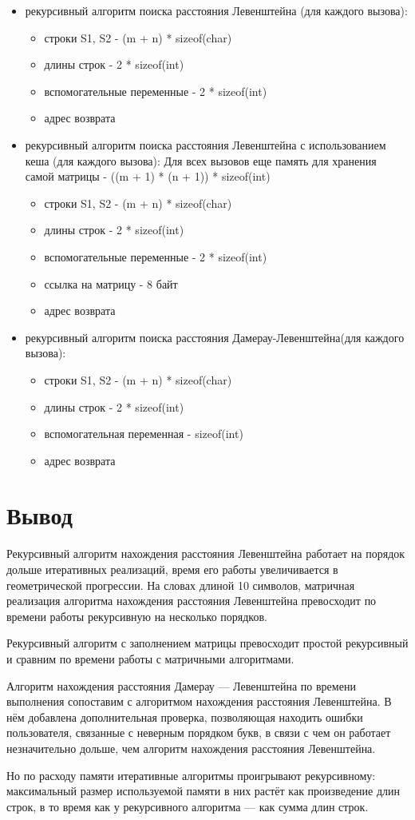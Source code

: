 \begin{itemize}
	\item рекурсивный алгоритм поиска расстояния Левенштейна (для каждого вызова):\begin{itemize}
		\item строки S1, S2 - (m + n) * sizeof(char)
		\item длины строк - 2 * sizeof(int)
		\item вспомогательные переменные -  2 * sizeof(int)
		\item адрес возврата
	\end{itemize}
	\item рекурсивный алгоритм поиска расстояния Левенштейна с использованием кеша (для каждого вызова): Для всех вызовов еще память для хранения самой матрицы -  ((m + 1) * (n + 1)) * sizeof(int) \begin{itemize}
		\item строки S1, S2 - (m + n) * sizeof(char)
		\item длины строк - 2 * sizeof(int)
		\item вспомогательные переменные -  2 * sizeof(int)
		\item ссылка на матрицу - 8 байт
		\item адрес возврата
	\end{itemize}
	\item рекурсивный алгоритм поиска расстояния Дамерау-Левенштейна(для каждого вызова):\begin{itemize}
		\item строки S1, S2 - (m + n) * sizeof(char)
		\item длины строк - 2 * sizeof(int)
		\item вспомогательная переменная -  sizeof(int)
		\item адрес возврата
	\end{itemize}
\end{itemize}


\section*{Вывод}

Рекурсивный алгоритм нахождения расстояния Левенштейна работает на порядок дольше итеративных реализаций, время его работы увеличивается в геометрической прогрессии. На словах длиной 10 символов, матричная реализация алгоритма нахождения расстояния Левенштейна превосходит по времени работы рекурсивную на несколько порядков.

Рекурсивный алгоритм с заполнением матрицы превосходит простой рекурсивный и сравним по времени работы с матричными алгоритмами. 

Алгоритм нахождения расстояния Дамерау — Левенштейна по времени выполнения сопоставим с алгоритмом нахождения расстояния Левенштейна. В нём добавлена дополнительная проверка, позволяющая находить ошибки пользователя, связанные с неверным порядком букв, в связи с чем он работает незначительно дольше, чем алгоритм нахождения расстояния Левенштейна.

Но по расходу памяти итеративные алгоритмы проигрывают рекурсивному: максимальный размер используемой памяти в них растёт как произведение длин строк, в то время как у рекурсивного алгоритма — как сумма длин строк.
